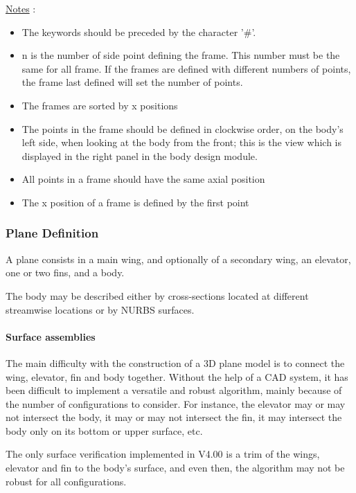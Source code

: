 \documentclass[a4paper,twoside,12pt,dvips]{article}
\begin{document}
\underline{Notes} :

\begin{itemize}
\item The keywords should be preceded by the character '\#'.
\item n is the number of side point defining the frame. This number
must be the same for all frame. If the frames are defined with
different numbers of points, the frame last defined will set the
number of points.
\item The frames are sorted by x positions
\item The points in the frame should be defined in clockwise order, on
the body's left side, when looking at the body from the front; this is
the view which is displayed in the right panel in the body design
module.
\item All points in a frame should have the same axial position
\item The x position of a frame is defined by the first point
\end{itemize}

\subsubsection{Plane Definition}

A plane consists in a main wing, and optionally of a secondary wing,
an elevator, one or two fins, and a body.

The body may be described either by cross-sections located at
different streamwise locations or by NURBS surfaces.

\paragraph[Surface assemblies]{Surface assemblies}

The main difficulty with the construction of a 3D plane model is to
connect the wing, elevator, fin and body together. Without the help of
a CAD system, it has been difficult to implement a versatile and
robust algorithm, mainly because of the number of configurations to
consider.  For instance, the elevator may or may not intersect the
body, it may or may not intersect the fin, it may intersect the body
only on its bottom or upper surface, etc.

The only surface verification implemented in V4.00 is a trim of the
wings, elevator and fin to the body's surface, and even then, the
algorithm may not be robust for all configurations.
\end{document}

